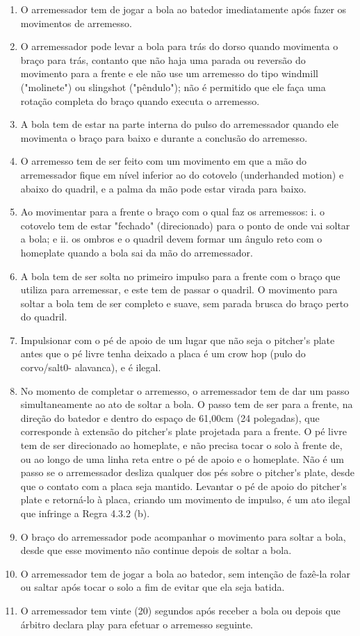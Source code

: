 \begin{enumerate}[label=(\alph*)]
	\item  O arremessador tem de jogar a bola ao batedor imediatamente após fazer os movimentos de arremesso.
	\item  O arremessador pode levar a bola para trás do dorso quando movimenta o braço para trás, contanto que não haja uma parada ou reversão do movimento para a frente e ele não use um arremesso do tipo \gls{windmill} ("molinete") ou \gls{slingshot} ("pêndulo"); não é permitido que ele faça uma rotação completa do braço quando executa o arremesso.

	\item  A bola tem de estar na parte interna do pulso do arremessador quando ele movimenta o braço para baixo e durante a conclusão do arremesso.
	\item  O arremesso tem de ser feito com um movimento em que a mão do arremessador fique em nível inferior ao do cotovelo (\gls{underhanded motion}) e
	 abaixo do quadril, e a palma da mão pode estar virada para baixo.
	\item  Ao movimentar para a frente o braço com o qual faz os arremessos:
	 i. o cotovelo tem de estar "fechado" (direcionado) para o ponto de onde vai soltar a bola; e
	 ii. os ombros e o quadril devem formar um ângulo reto com o \gls{homeplate} quando a bola sai da mão do arremessador.
	\item  A bola tem de ser solta no primeiro impulso para a frente com o braço que utiliza para arremessar, e este tem de passar o quadril. O movimento para soltar a bola tem de ser completo e suave, sem parada brusca do braço perto do quadril.
	\item   Impulsionar com o pé de apoio de um lugar que não seja o \gls{pitcher's plate} antes que o pé livre tenha deixado a placa é um \gls{crow hop} (pulo do corvo/salt0- alavanca), e é ilegal.
	\item   No momento de completar o arremesso, o arremessador tem de dar um passo simultaneamente ao ato de soltar a bola. O passo tem de ser para a frente, na  direção do batedor e dentro do espaço de 61,00cm (24 polegadas), que corresponde à extensão do \gls{pitcher's plate} projetada para a frente. O pé livre tem de ser direcionado ao \gls{homeplate}, e não precisa tocar o solo à frente de, ou ao longo de uma linha reta entre o pé de apoio e o \gls{homeplate}. Não é um passo se o arremessador desliza qualquer dos pés sobre o \gls{pitcher's plate}, desde que o contato com a placa seja mantido. Levantar o pé de apoio do \gls{pitcher's plate} e retorná-lo à placa, criando um movimento de impulso, é um ato ilegal que infringe a Regra 4.3.2 (b).
		\item  O braço do arremessador pode acompanhar o movimento para soltar a bola, desde que esse movimento não continue depois de soltar a bola.
	\item   O arremessador tem de jogar a bola ao batedor, sem intenção de fazê-la rolar ou saltar após tocar o solo a fim de evitar que ela seja batida.
	\item   O arremessador tem vinte (20) segundos após receber a bola ou depois que árbitro declara \gls{play} para efetuar o arremesso seguinte.
\end{enumerate}

